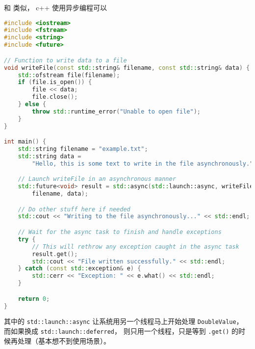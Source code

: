 

\begin{issues}
\issueDraft
\end{issues}

和 类似， c++ 使用异步编程可以

\begin{lstlisting}[language=cpp]
#include <iostream>
#include <fstream>
#include <string>
#include <future>

// Function to write data to a file
void writeFile(const std::string& filename, const std::string& data) {
    std::ofstream file(filename);
    if (file.is_open()) {
        file << data;
        file.close();
    } else {
        throw std::runtime_error("Unable to open file");
    }
}

int main() {
    std::string filename = "example.txt";
    std::string data =
        "Hello, this is some text to write in the file asynchronously.";

    // Launch writeFile in an asynchronous manner
    std::future<void> result = std::async(std::launch::async, writeFile,
        filename, data);

    // Do other stuff here if needed
    std::cout << "Writing to the file asynchronously..." << std::endl;

    // Wait for the async task to finish and handle exceptions
    try {
        // This will rethrow any exception caught in the async task
        result.get();
        std::cout << "File written successfully." << std::endl;
    } catch (const std::exception& e) {
        std::cerr << "Exception: " << e.what() << std::endl;
    }

    return 0;
}
\end{lstlisting}
其中的 \verb`std::launch::async` 让系统用另一个线程马上开始处理 \verb`DoubleValue`， 而如果换成 \verb`std::launch::deferred`， 则只用一个线程，只是等到 \verb`.get()` 的时候再处理（基本想不到使用场景）。
